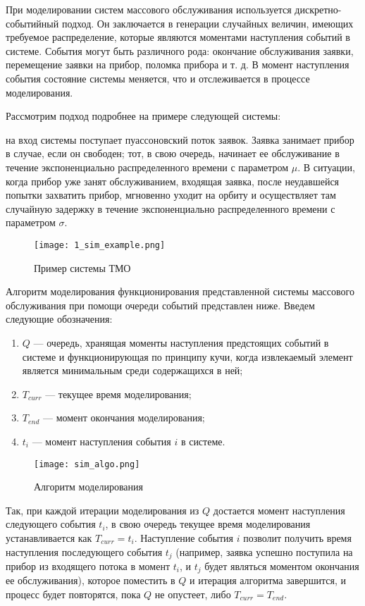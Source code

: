 При моделировании систем массового обслуживания используется дискретно-событийный подход. Он заключается в генерации случайных величин, имеющих требуемое распределение, которые являются моментами наступления событий в системе. События могут быть различного рода: окончание обслуживания заявки, перемещение заявки на прибор, поломка прибора и т. д. В момент наступления события состояние системы меняется, что и отслеживается в процессе моделирования.

Рассмотрим подход подробнее на примере следующей системы:

на вход системы поступает пуассоновский поток заявок. Заявка занимает прибор в случае, если он свободен; тот, в свою очередь, начинает ее обслуживание в течение экспоненциально распределенного времени с параметром $\mu$. В ситуации, когда прибор уже занят обслуживанием, входящая заявка, после неудавшейся попытки захватить прибор, мгновенно уходит на орбиту и осуществляет там случайную задержку в течение экспоненциально распределенного времени с параметром $\sigma$.

\begin{figure}[H]
	\centering
	\texttt{[image: 1\_sim\_example.png]}
	\caption{Пример системы ТМО}
	\label{sys_tmo_example}
\end{figure}

Алгоритм моделирования функционирования представленной системы массового обслуживания при помощи очереди событий представлен ниже.
Введем следующие обозначения:
\begin{enumerate}
	\item $Q$ --- очередь, хранящая моменты наступления предстоящих событий в системе и функционирующая по принципу кучи, когда извлекаемый элемент является минимальным среди содержащихся в ней;
	\item $T_{curr}$ --- текущее время моделирования;
	\item $T_{end}$ --- момент окончания моделирования;
	\item $t_i$ --- момент наступления события $i$ в системе. 
	\end{enumerate}

\begin{figure}[H]
	\centering
	\texttt{[image: sim\_algo.png]}
	\caption{Алгоритм моделирования}
	\label{sys_tmo_algo}
\end{figure}

Так, при каждой итерации моделирования из $Q$ достается момент наступления следующего события $t_i$, в свою очередь текущее время моделирования устанавливается как $T_{curr} = t_i$. Наступление события $i$ позволит получить время наступления последующего события $t_j$ (например, заявка успешно поступила на прибор из входящего потока в момент $t_i$, и $t_j$ будет являться моментом окончания ее обслуживания), которое поместить в $Q$ и итерация алгоритма завершится, и процесс будет повторятся, пока $Q$ не опустеет, либо $T_{curr} = T_{end}$.

